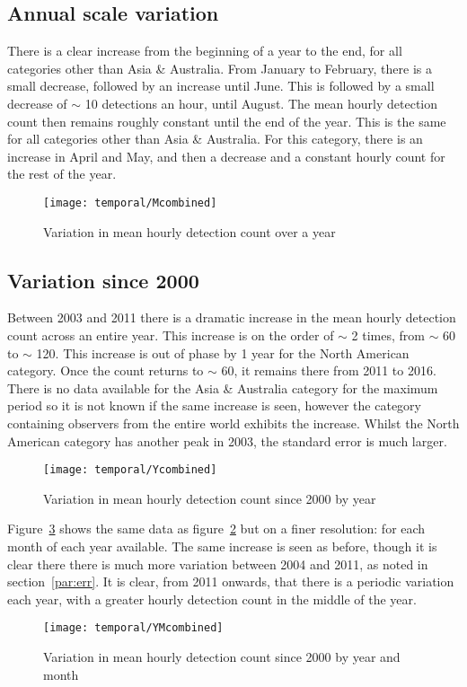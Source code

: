 \subsection{Annual scale variation}
There is a clear increase from the beginning of a year to the end, for all categories other than Asia \& Australia. From January to February, there is a small decrease, followed by an increase until June. This is followed by a small decrease of $\sim$ 10 detections an hour, until August. The mean hourly detection count then remains roughly constant until the end of the year. This is the same for all categories other than Asia \& Australia. For this category, there is an increase in April and May, and then a decrease and a constant hourly count for the rest of the year.
\begin{figure}[h!]
	\centering
	\texttt{[image: temporal/Mcombined]}
	\caption{Variation in mean hourly detection count over a year
		\label{fig:temp:month}}
\end{figure}
\subsection{Variation since 2000}
Between 2003 and 2011 there is a dramatic increase in the mean hourly detection count across an entire year. This increase is on the order of $\sim$ 2 times, from $\sim$ 60 to $\sim$ 120. This increase is out of phase by 1 year for the North American category. Once the count returns to $\sim$ 60, it remains there from 2011 to 2016. There is no data available for the Asia \& Australia category for the maximum period so it is not known if the same increase is seen, however the category containing observers from the entire world exhibits the increase. Whilst the North American category has another peak in 2003, the standard error is much larger.
\begin{figure}[h!]
	\centering
	\texttt{[image: temporal/Ycombined]}
	\caption{Variation in mean hourly detection count since 2000 by year
		\label{fig:temp:year}}
\end{figure}
Figure~\ref{fig:temp:yearmonth} shows the same data as figure~\ref{fig:temp:year} but on a finer resolution: for each month of each year available. The same increase is seen as before, though it is clear there there is much more variation between 2004 and 2011, as noted in section~\ref{par:err}. It is clear, from 2011 onwards, that there is a periodic variation each year, with a greater hourly detection count in the middle of the year.
\begin{figure}[h!]
	\centering
	\texttt{[image: temporal/YMcombined]}
	\caption{Variation in mean hourly detection count since 2000 by year and month
		\label{fig:temp:yearmonth}}
\end{figure}
